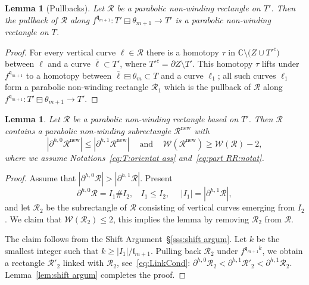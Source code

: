 \documentclass{amsart}
\renewcommand{\sp}{{\ \ }}
\newcommand{\1}{{\mathbb 1 }}
\newcommand{\Width}{{\mathcal W}}
\newcommand\RR{\mathcal{R}}
\newcommand{\qq}{\mathfrak{q}}
\newcommand{\length}{{\mathfrak l}}
\newcommand\new{{\operatorname{new}}}
\newcommand{\C}{\mathbb{C}}
\newtheorem{lem}[thm]{Lemma}
\theoremstyle{remark}
\numberwithin{equation}{section}
\theoremstyle{definition}
\begin{document}
\begin{lem}[Pullbacks]
\label{lem:Rect:pullback}
Let $\RR$ be a parabolic non-winding rectangle on $T'$. Then the pullback of $\RR$ along $f^{\qq_{m+1}}\colon T'\boxminus \theta_{m+1}\to T'$ is a parabolic non-winding rectangle on $T$.
\end{lem}
\begin{proof}
For every vertical curve $\ell\in \RR$ there is a homotopy $\tau$ in $\C\setminus \big(Z\cup T'^c\big)$ between $\ell$ and a curve $\bar \ell\subset T'$, where $T'^c=\partial Z\setminus T'$. This homotopy $\tau$ lifts under $f^{\qq_{m+1}}$ to a homotopy between $\bar \ell\boxminus \theta_m\subset T$ and a curve $\ell_1$; all such curves $\ell_1$ form a parabolic non-winding rectangle $\RR_1$ which is the pullback of $\RR$ along $f^{\qq_{m+1}}\colon T'\boxminus \theta_{m+1}\to T'$.
\end{proof}


\begin{lem}
\label{lem:left balanc}
Let $\RR$ be a parabolic non-winding rectangle based on $T'$. Then $\RR$ contains a parabolic non-winding subrectangle $\RR^\new$ with 
\begin{equation}
\label{eq:lem:left balanc}
|\partial^{h,0}\RR^\new |\le |\partial^{h,1}\RR^{\new}|\sp\sp\text{ and }\sp \sp\Width(\RR^\new) \ge \Width(\RR)-2,
\end{equation}
where we assume Notations~\eqref{eq:T:orientat ass} and~\eqref{eq:part RR:notat}.
\end{lem}
\begin{proof}
Assume that $|\partial^{h,0}\RR |> |\partial^{h,1}\RR|$. Present \[\partial ^{h,0}\RR=I_1\#I_2,\sp\sp I_1\le I_2,\sp\sp \sp |I_1|=|\partial^{h,1}\RR|,\]
and let $\RR_2$ be the subrectangle of $\RR$ consisting of vertical curves emerging from $I_2$. We claim that $\Width(\RR_2)\le 2$, this implies the lemma by removing $\RR_2$ from $\RR$.

The claim follows from the Shift Argument~\S\ref{sss:shift argum}. Let $k$ be the smallest integer such that $k\ge |I_1|/\length_{m+1}$. Pulling back $\RR_2$ under $f^{\qq_{m+1}k}$, we obtain a rectangle $\RR'_2$ linked with $\RR_2$, see~\eqref{eq:LinkCond}:
$\partial^{h,0} \RR_2 < \partial ^{h,1}\RR'_2 <\partial^{h,1}\RR_2.$ Lemma~\ref{lem:shift argum} completes the proof.
\end{proof}
\end{document}
